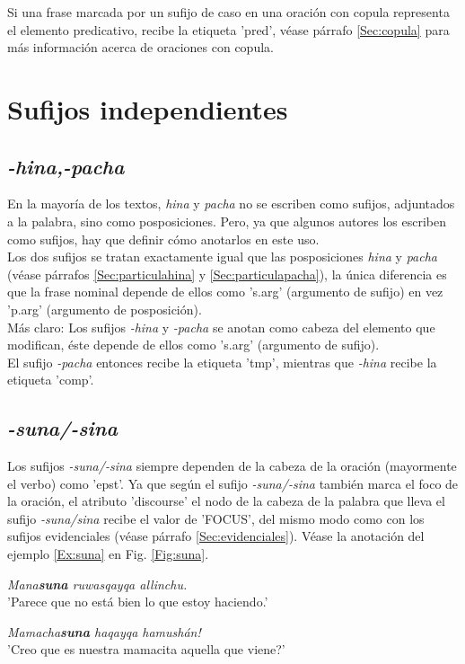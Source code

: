 \documentclass[a4paper,11pt,DIV12]{scrartcl}
\begin{document}
Si una frase marcada por un sufijo de caso en una oraci\'on con copula representa el elemento predicativo, recibe la etiqueta 'pred', v\'ease p\'arrafo \ref{Sec:copula} para m\'as informaci\'on acerca de oraciones con copula.




\section{Sufijos independientes}
 \subsection{{\em -hina,-pacha}}\label{Sec:hinapachasufijos}
En la mayor\'ia de los textos, {\em hina} y {\em pacha} no se escriben como sufijos, adjuntados a la palabra, sino como posposiciones. Pero, ya que algunos autores los escriben como sufijos, hay que definir c\'omo anotarlos en este uso.\\
Los dos sufijos se tratan exactamente igual que las posposiciones {\em hina} y {\em pacha} (v\'ease p\'arrafos \ref{Sec:particulahina} y \ref{Sec:particulapacha}), la \'unica diferencia es que la frase nominal depende de ellos como 's.arg' (argumento de sufijo) en vez 'p.arg' (argumento de posposici\'on).\\ M\'as claro:
 Los sufijos {\em -hina} y {\em -pacha} se anotan como cabeza del elemento que modifican, \'este depende de ellos como 's.arg' (argumento de sufijo).\\
El sufijo {\em -pacha} entonces recibe la etiqueta 'tmp', mientras que {\em -hina} recibe la etiqueta 'comp'.

\subsection{{\em -suna/-sina}}
Los sufijos {\em -suna/-sina} siempre dependen de la cabeza de la oraci\'on (mayormente el verbo) como 'epst'. Ya que seg\'un \citeauthor{Cusi2} el sufijo {\em -suna/-sina} tambi\'en marca el foco de la oraci\'on, el atributo 'discourse' el nodo de la cabeza de la palabra que lleva el sufijo {\em -suna/sina} recibe el valor de 'FOCUS', del mismo modo como con los sufijos evidenciales (v\'ease p\'arrafo \ref{Sec:evidenciales}). V\'ease la anotaci\'on del ejemplo \ref{Ex:suna} en Fig. \ref{Fig:suna}.

\begin{examples}
 \item {\em Mana\textbf{suna} ruwasqayqa allinchu.}\\
      'Parece que no est\'a bien lo que estoy haciendo.'
\item\label{Ex:suna} {\em Mamacha\textbf{suna} haqayqa hamush\'an!}\\
      '{\textquestiondown}Creo que es nuestra mamacita aquella que viene?'\\
    		\hfill{\small \citep[235]{Cusi2}}
\end{examples}
\end{document}
